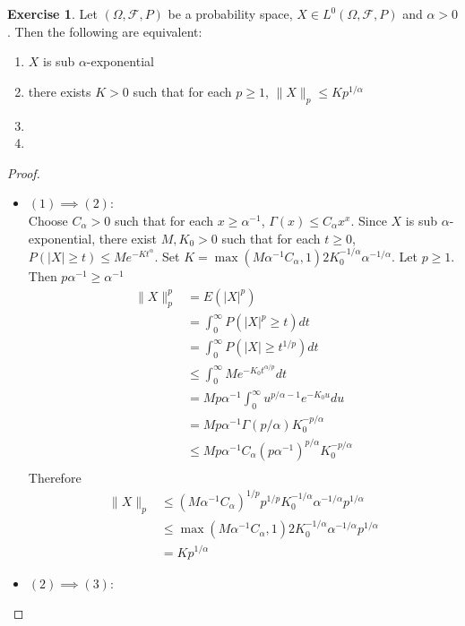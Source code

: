 \documentclass[12pt]{amsart}
\theoremstyle{definition}
\newtheorem{ex}[definition]{Exercise}
\newcommand{\al}{\alpha}
\newcommand{\Om}{\Omega}
\newcommand{\MF}{\mathcal{F}}
\begin{document}
	\begin{ex}
		Let $(\Om, \MF, P)$ be a probability space, $X \in L^0(\Om, \MF, P)$ and $\al > 0$. Then the following are equivalent:
		\begin{enumerate}
			\item $X$ is sub $\al$-exponential
			\item there exists $K > 0$ such that for each $p \geq 1$, $\|X\|_p \leq K p^{1/\al}$ 
			\item 
			\item 
		\end{enumerate} 
	\end{ex}

	\begin{proof}\
		\begin{itemize}
			\item $(1) \implies (2)$: \\
			Choose $C_{\al} > 0$ such that for each $x \geq \al^{-1}$, $\Gamma(x) \leq C_{\al} x^x$. Since $X$ is sub $\al$-exponential, there exist $M, K_0 >0$ such that for each $t \geq 0$, $P(|X| \geq t) \leq Me^{-Kt^{\al}}$. Set $K = \max(M\al^{-1}C_{\al}, 1) 2 K_0^{-1/\al} \al^{-1/\al}$. Let $p \geq 1$. Then $p \al^{-1} \geq \al^{-1}$
			\begin{align*}
				\|X\|_p^p 
				&= E(|X|^p) \\
				&= \int_0^{\infty} P(|X|^p \geq t)dt \\
				&= \int_0^{\infty} P(|X| \geq t^{1/p})dt \\
				& \leq \int_0^{\infty} M e^{-K_0 t^{\al / p}}dt \\
				&= Mp \al^{-1} \int_0^{\infty} u^{p/\al - 1} e^{-K_0 u} du \\
				&=  Mp \al^{-1} \Gamma(p / \al)K_0^{-p/\al} \\
				& \leq Mp \al^{-1} C_{\al} (p \al^{-1})^{p  /\al}K_0^{-p/\al} \\
			\end{align*} 
		Therefore 
		\begin{align*}
			\|X\|_p 
			& \leq (M\al^{-1}C_{\al})^{1/p} p^{1/p} K_0^{-1/\al} \al^{-1/\al} p^{1/\al}  \\
			& \leq \max(M\al^{-1}C_{\al}, 1) 2 K_0^{-1/\al} \al^{-1/\al} p^{1/\al} \\
			&= K p^{1/\al} 
		\end{align*}
			\item $(2) \implies (3)$: \\
			
		\end{itemize}
	\end{proof}
	
\end{document}
